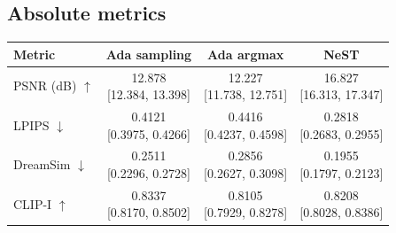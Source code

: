 \documentclass[11pt,letterpaper]{article}
\begin{document}
\subsection*{Absolute metrics}
\begin{center}\small\setlength{\tabcolsep}{7pt}\renewcommand{\arraystretch}{1.55}
\begin{tabular}{lccc}
\toprule
Metric & Ada sampling & Ada argmax & NeST\\\midrule
PSNR (dB) $\uparrow$ & \shortstack{12.878\\{}[12.384, 13.398]} & \shortstack{12.227\\{}[11.738, 12.751]} & \shortstack{16.827\\{}[16.313, 17.347]}\\
LPIPS $\downarrow$ & \shortstack{0.4121\\{}[0.3975, 0.4266]} & \shortstack{0.4416\\{}[0.4237, 0.4598]} & \shortstack{0.2818\\{}[0.2683, 0.2955]}\\
DreamSim $\downarrow$ & \shortstack{0.2511\\{}[0.2296, 0.2728]} & \shortstack{0.2856\\{}[0.2627, 0.3098]} & \shortstack{0.1955\\{}[0.1797, 0.2123]}\\
CLIP-I $\uparrow$ & \shortstack{0.8337\\{}[0.8170, 0.8502]} & \shortstack{0.8105\\{}[0.7929, 0.8278]} & \shortstack{0.8208\\{}[0.8028, 0.8386]}\\
\bottomrule\end{tabular}\end{center}
\end{document}
